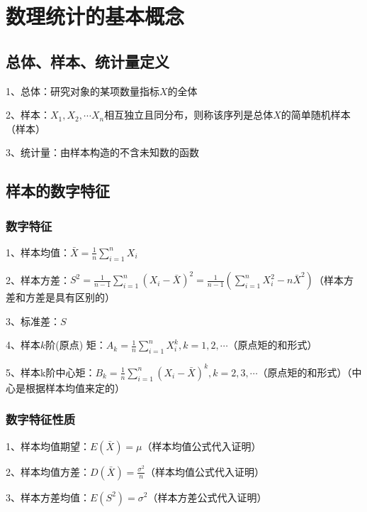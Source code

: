 \chapter{数理统计的基本概念}

\section{总体、样本、统计量定义}

1、总体：研究对象的某项数量指标$X$的全体

2、样本：$X_1,X_2,\cdots X_n$相互独立且同分布，则称该序列是总体$X$的简单随机样本（样本）

3、统计量：由样本构造的不含未知数的函数

\section{样本的数字特征}



\subsection{数字特征}

1、样本均值：$\bar{X}=\frac{1}{n} \sum_{i=1}^{n} X_{i}$

2、样本方差：$S^{2}=\frac{1}{n-1} \sum_{i=1}^{n}\left(X_{i}-\bar{X}\right)^{2}=\frac{1}{n-1}\left(\sum_{i=1}^{n} X_{i}^{2}-n \bar{X}^{2}\right)$（样本方差和方差是具有区别的）

3、标准差：$S$

4、样本$k$阶(原点) 矩：$A_{k}=\frac{1}{n} \sum_{i=1}^{n} X_{i}^{k}, k=1,2, \cdots$（原点矩的和形式）

5、样本k阶中心矩：$B_{k}=\frac{1}{n} \sum_{i=1}^{n}\left(X_{i}-\bar{X}\right)^{k}, k=2,3, \cdots$（原点矩的和形式）（中心是根据样本均值来定的）



\subsection{数字特征性质}

1、样本均值期望：$E(\bar{X}) = \mu$（样本均值公式代入证明）

2、样本均值方差：$D(\bar{X}) = \frac{\sigma^2}{n}$（样本均值公式代入证明）

3、样本方差均值：$E(S^2) = \sigma^2$（样本方差公式代入证明）

